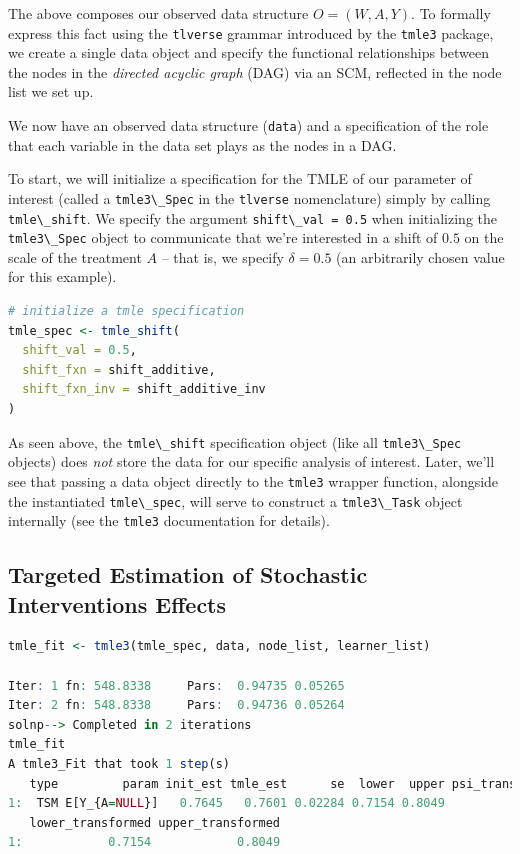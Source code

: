 \documentclass[
  12pt, krantz2,
]{krantz}
\newcommand{\passthrough}[1]{#1}
\newcommand{\1}{\mathbbm{1}}
\theoremstyle{definition}
\theoremstyle{definition}
\theoremstyle{definition}
\theoremstyle{definition}
\theoremstyle{remark}
\begin{document}
The above composes our observed data structure \(O = (W, A, Y)\). To formally
express this fact using the \passthrough{\lstinline!tlverse!} grammar introduced by the \passthrough{\lstinline!tmle3!} package,
we create a single data object and specify the functional relationships between
the nodes in the \emph{directed acyclic graph} (DAG) via an SCM, reflected in the
node list we set up.

We now have an observed data structure (\passthrough{\lstinline!data!}) and a specification of the role
that each variable in the data set plays as the nodes in a DAG.

To start, we will initialize a specification for the TMLE of our parameter of
interest (called a \passthrough{\lstinline!tmle3\_Spec!} in the \passthrough{\lstinline!tlverse!} nomenclature) simply by calling
\passthrough{\lstinline!tmle\_shift!}. We specify the argument \passthrough{\lstinline!shift\_val = 0.5!} when initializing the
\passthrough{\lstinline!tmle3\_Spec!} object to communicate that we're interested in a shift of \(0.5\) on
the scale of the treatment \(A\) -- that is, we specify \(\delta = 0.5\) (an
arbitrarily chosen value for this example).

\begin{lstlisting}[language=R]
# initialize a tmle specification
tmle_spec <- tmle_shift(
  shift_val = 0.5,
  shift_fxn = shift_additive,
  shift_fxn_inv = shift_additive_inv
)
\end{lstlisting}

As seen above, the \passthrough{\lstinline!tmle\_shift!} specification object (like all \passthrough{\lstinline!tmle3\_Spec!}
objects) does \emph{not} store the data for our specific analysis of interest. Later,
we'll see that passing a data object directly to the \passthrough{\lstinline!tmle3!} wrapper function,
alongside the instantiated \passthrough{\lstinline!tmle\_spec!}, will serve to construct a \passthrough{\lstinline!tmle3\_Task!}
object internally (see the \passthrough{\lstinline!tmle3!} documentation for details).

\hypertarget{targeted-estimation-of-stochastic-interventions-effects}{%
\subsection{Targeted Estimation of Stochastic Interventions Effects}\label{targeted-estimation-of-stochastic-interventions-effects}}

\begin{lstlisting}[language=R]
tmle_fit <- tmle3(tmle_spec, data, node_list, learner_list)

Iter: 1 fn: 548.8338     Pars:  0.94735 0.05265
Iter: 2 fn: 548.8338     Pars:  0.94736 0.05264
solnp--> Completed in 2 iterations
tmle_fit
A tmle3_Fit that took 1 step(s)
   type         param init_est tmle_est      se  lower  upper psi_transformed
1:  TSM E[Y_{A=NULL}]   0.7645   0.7601 0.02284 0.7154 0.8049          0.7601
   lower_transformed upper_transformed
1:            0.7154            0.8049
\end{lstlisting}
\end{document}
